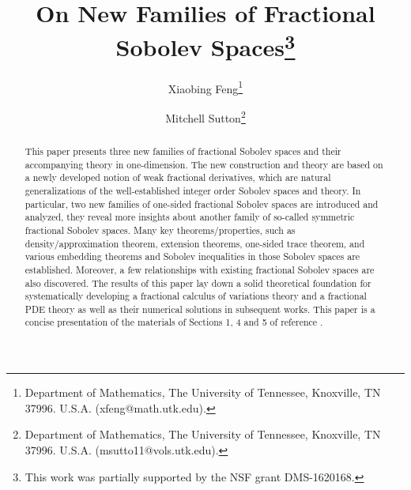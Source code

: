 \documentclass[leqno,final]{siamltex}
\numberwithin{equation}{section}
\renewcommand{\(}{\bigl(}
\renewcommand{\)}{\bigr)}
\begin{document}
\title{On New Families of Fractional Sobolev Spaces\thanks{This work was partially supported by the NSF grant DMS-1620168.} }

%
	
\author{Xiaobing Feng\thanks{Department of Mathematics, The University of Tennessee, 
Knoxville, TN 37996. U.S.A. (xfeng@math.utk.edu).}
\and{Mitchell Sutton}\thanks{Department of Mathematics, The University of Tennessee, 
Knoxville, TN 37996. U.S.A. (msutto11@vols.utk.edu).} }

\date{}

\maketitle
 
\thispagestyle{empty}

\begin{abstract}
 This paper presents three new families of fractional Sobolev spaces 
    	and their accompanying theory in one-dimension. The new construction 
    	and theory are based on a newly developed notion of weak fractional derivatives, 
    	which are natural generalizations of the well-established integer order Sobolev 
    	spaces and theory. In particular, two new families of one-sided fractional 
    	Sobolev spaces 
        are introduced and analyzed,  they reveal more insights about another family of   
        so-called symmetric fractional Sobolev spaces. Many key theorems/properties, such as density/approximation theorem, extension theorems, one-sided trace theorem, and 
        various embedding theorems and Sobolev inequalities in those Sobolev spaces are 
        established. Moreover, 
        a few relationships with existing fractional Sobolev spaces are also discovered. 
       The results of this paper lay down a solid theoretical foundation 
       for systematically developing a fractional calculus of 
       variations theory and a fractional PDE theory as well as their numerical 
       solutions in subsequent works. 
       This paper is a concise presentation of the materials of Sections 1, 4 and 5 of reference \cite{Feng_Sutton}. 
\end{abstract}
\end{document}
